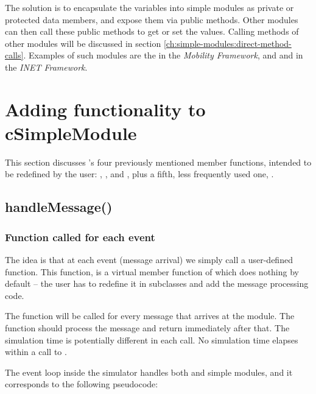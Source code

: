 The solution is to encapsulate the variables into simple modules
as private or protected data members, and expose them via public methods.
Other modules can then call these public methods to get or set the values.
Calling methods of other modules will be discussed in section
\ref{ch:simple-modules:direct-method-calls}.
Examples of such modules are the  in the \textit{Mobility Framework},
and  and  in the \textit{INET Framework}.



\section{Adding functionality to cSimpleModule}
\label{sec:simple-modules:adding-functionality-to-csimplemodule}

This section discusses 's four previously
mentioned member functions, intended to be redefined by the user:
, , 
and , plus a fifth, less frequently used one,
.



\subsection{handleMessage()}
\label{sec:simple-modules:handlemessage}

\subsubsection{Function called for each event}


The idea is that at each event (message arrival) we
simply call a user-defined function. This function,
 is a
virtual member function of  which does
nothing by default -- the user has to redefine it in subclasses
and add the message processing code.

The  function will be called for every message
that arrives at the module. The function should process the message
and return immediately after that. The simulation time is potentially
different in each call. No simulation time elapses within a call
to .

The event loop inside the simulator handles both 
and  simple modules, and it corresponds
to the following pseudocode:

